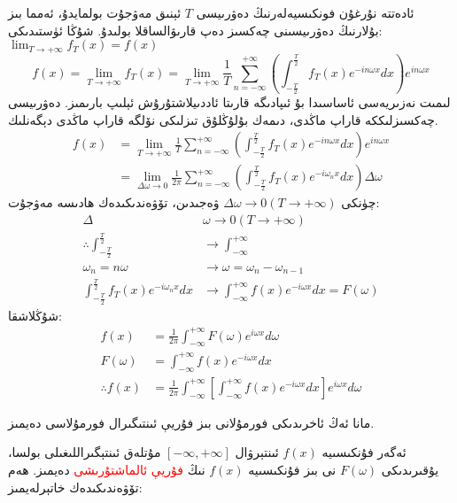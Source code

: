  ئادەتتە نۇرغۇن فونكىسيەلەرنىڭ دەۋرىيسى $T$ ئېنىق مەۋجۇت بولمايدۇ، ئەمما بىز بۇلارنىڭ دەۋرىيسىنى چەكسىز دەپ قارىۋالساقلا بولىدۇ.  شۇڭا ئۈستىدىكى: $\lim_{T \to + \infty}f_T(x) = f(x)$ 
 $$
 f(x) = \lim_{T \to + \infty}f_T(x) = \lim_{T \to +\infty} \frac{1}{T}\sum_{n=-\infty}^{+\infty} \left (\int_{-\frac{T}{2}}^{\frac{T}{2}} f_T(x)e^{-in \omega x}dx \right)e^{in \omega x}
 $$
 لىمىت نەزىريەسى ئاساسىدا بۇ ئىپادىگە قارىتا ئاددىيلاشتۇرۇش ئېلىپ بارىمىز. دەۋرىيسى چەكسىزلىككە قاراپ ماڭدى، دىمەك بۇلۇڭلۇق تىزلىكى نۆلگە قاراپ ماڭدى دېگەنلىك.
\begin{align*}
 f(x) &= \lim_{T \to +\infty} \frac{1}{T}\sum_{n=-\infty}^{+\infty} \left (\int_{-\frac{T}{2}}^{\frac{T}{2}} f_T(x)e^{-in \omega x}dx \right)e^{in \omega x} \\
 &= \lim_{\Delta \omega \to 0}\frac{1}{2 \pi} \sum_{n=-\infty}^{+\infty} 
 \left (\int_{-\frac{T}{2}}^{\frac{T}{2}} f_T(x)e^{-i\omega_n x}dx \right) \Delta \omega
\end{align*}
چۈنكى $\Delta \omega \to 0(T \to +\infty)$ ۋەجىدىن، تۆۋەندىكىدەك ھادىسە مەۋجۇت:
\begin{align*}
\Delta &\omega \to 0(T \to +\infty) \\
\therefore \int_{-\frac{T}{2}}^{\frac{T}{2}} &\rightarrow \int_{-\infty}^{+\infty} \\
{\omega_n=n\omega} &\rightarrow {\omega=\omega_n-\omega_{n-1}} \\
\int_{-\frac{T}{2}}^{\frac{T}{2}} f_T(x)e^{-i\omega_n x}dx &\rightarrow
\int_{-\infty}^{+\infty} f(x)e^{-i\omega x}dx = F(\omega)
\end{align*}
شۇڭلاشقا:
\begin{align*}
f(x) &= \frac{1}{2 \pi} \int_{-\infty}^{+\infty}F(\omega)e^{i \omega x}d\omega \\
F(\omega) &= \int_{-\infty}^{+\infty} f(x)e^{-i\omega x}dx \\
\therefore f(x) &= \frac{1}{2 \pi} \int_{-\infty}^{+\infty}\left [ \int_{-\infty}^{+\infty} f(x)e^{-i\omega x}dx \right]
e^{i \omega x}d\omega
\end{align*}

مانا ئەڭ ئاخرىدىكى فورمۇلانى بىز فۇريې ئىنتىگىرال فورمۇلاسى دەيمىز.

ئەگەر فۇنكىسىيە $f(x)$ ئىنتېرۋال $[-\infty,+\infty]$ مۇتلەق ئىنتېگىراللىغىلى بولسا، يۇقىرىدىكى $F(\omega)$ نى بىز فۇنكىسىيە $f(x)$ نىڭ 
\textcolor{red}{فۇريې ئالماشتۇرىشى}
دەيمىز. ھەم تۆۋەندىكىدەك خاتېرلەيمىز:
\begin{center}
\end{center}

